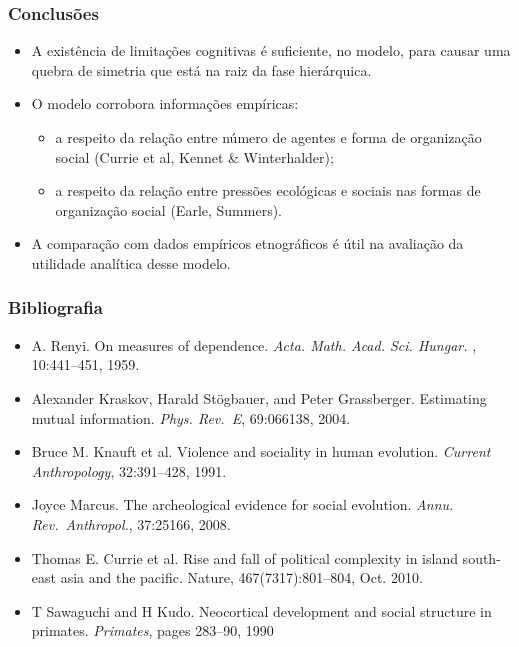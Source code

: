 \documentclass[ignorenonframetext,]{beamer}
\begin{document}
\begin{frame}\frametitle{Conclusões}

\begin{itemize}
\itemsep1pt\parskip0pt
\item
  A existência de limitações cognitivas é suficiente, no modelo, para
  causar uma quebra de simetria que está na raiz da fase hierárquica.
\item
  O modelo corrobora informações empíricas:

  \begin{itemize}
  \itemsep1pt\parskip0pt
  \item
    a respeito da relação entre número de agentes e forma de organização
    social (Currie et al, Kennet \& Winterhalder);
  \item
    a respeito da relação entre pressões ecológicas e sociais nas formas
    de organização social (Earle, Summers).
  \end{itemize}
\item
  A comparação com dados empíricos etnográficos é útil na avaliação da
  utilidade analítica desse modelo.
\end{itemize}

\end{frame}

\begin{frame}\frametitle{Bibliografia}

\begin{itemize}
\itemsep1pt\parskip0pt
\item
  A. Renyi. On measures of dependence. \emph{Acta. Math. Acad. Sci.
  Hungar.} , 10:441--451, 1959.
\item
  Alexander Kraskov, Harald Stögbauer, and Peter Grassberger. Estimating
  mutual information. \emph{Phys. Rev.~E}, 69:066138, 2004.
\item
  Bruce M. Knauft et al. Violence and sociality in human evolution.
  \emph{Current Anthropology}, 32:391--428, 1991.
\item
  Joyce Marcus. The archeological evidence for social evolution.
  \emph{Annu. Rev.~Anthropol.}, 37:25166, 2008.
\item
  Thomas E. Currie et al. Rise and fall of political complexity in
  island south-east asia and the pacific. Nature, 467(7317):801--804,
  Oct. 2010.
\item
  T Sawaguchi and H Kudo. Neocortical development and social structure
  in primates. \emph{Primates}, pages 283--90, 1990
\end{itemize}

\end{frame}
\end{document}
